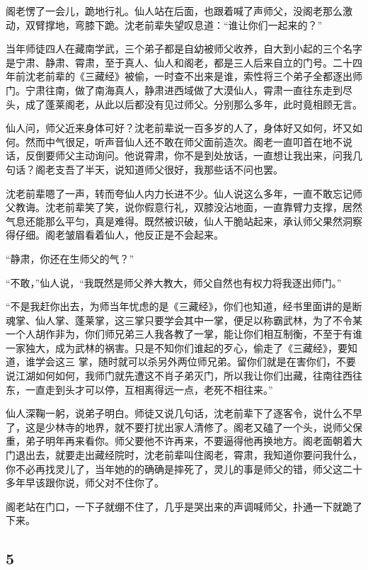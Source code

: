 阁老愣了一会儿，跪地行礼。仙人站在后面，也跟着喊了声师父，没阁老那么激动，双臂撑地，弯膝下跪。沈老前辈失望叹息道：“谁让你们一起来的？”

当年师徒四人在藏南学武，三个弟子都是自幼被师父收养，自大到小起的三个名字是宁肃、静肃、霄肃，至于真人、仙人和阁老，都是三人后来自立的门号。二十四年前沈老前辈的《三藏经》被偷，一时查不出来是谁，索性将三个弟子全都逐出师门。宁肃往南，做了南海真人，静肃进西域做了大漠仙人，霄肃一直往东走到尽头，成了蓬莱阁老，从此以后都没有见过师父。分别那么多年，此时竟相顾无言。

仙人问，师父近来身体可好？沈老前辈说一百多岁的人了，身体好又如何，坏又如何。然而中气很足，听声音仙人还不敢在师父面前造次。阁老一直叩首在地不说话，反倒要师父主动询问。他说霄肃，你不是到处放话，一直想让我出来，问我几句话？阁老支吾了半天，说知道师父很好，我那些话不问也罢。

沈老前辈嗯了一声，转而夸仙人内力长进不少。仙人说这么多年，一直不敢忘记师父教诲。沈老前辈笑了笑，说你假意行礼，双膝没沾地面，一直靠臂力支撑，居然气息还能那么平匀，真是难得。既然被识破，仙人干脆站起来，承认师父果然洞察得仔细。阁老皱眉看着仙人，他反正是不会起来。

“静肃，你还在生师父的气？”

“不敢，”仙人说，“我既然是师父养大教大，师父自然也有权力将我逐出师门。”

“不是我赶你出去，为师当年忧虑的是《三藏经》，你们也知道，经书里面讲的是断魂掌、仙人掌、蓬莱掌，这三掌只要学会其中一掌，便足以称霸武林，为了不令某一个人胡作非为，你们师兄弟三人我各教了一掌，能让你们相互制衡，不至于有谁一家独大，成为武林的祸害。只是不知你们谁起的歹心，偷走了《三藏经》，要知道，谁学会这三
掌，随时就可以杀另外两位师兄弟。留你们就是在害你们，不要说江湖如何如何，我师门就先遭这不肖子弟灭门，所以我让你们出藏，往南往西往东，一直走到头才可以停，互相离得远一点，老死不相往来。”

仙人深鞠一躬，说弟子明白。师徒又说几句话，沈老前辈下了逐客令，说什么不早了，这是少林寺的地界，就不要打扰出家人清修了。阁老又磕了一个头，说师父保重，弟子明年再来看你。师父要他不许再来，不要逼得他再换地方。阁老面朝着大门退出去，就要走出藏经院时，沈老前辈叫住阁老，霄肃，我知道你要问我什么，你不必再找灵儿了，当年她的的确确是摔死了，灵儿的事是师父的错，师父这二十多年早该跟你说，师父对不住你了。

阁老站在门口，一下子就绷不住了，几乎是哭出来的声调喊师父，扑通一下就跪了下来。
\newline

{\centering\subsection{5}}

